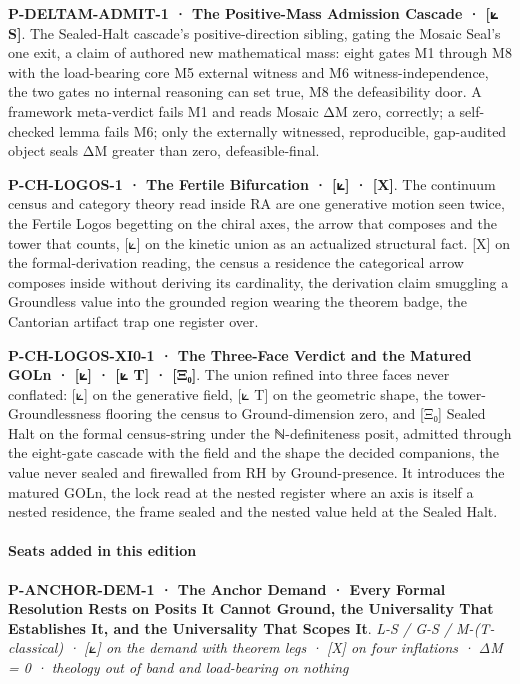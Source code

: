 \documentclass[10pt,twocolumn]{article}
\begin{document}
\textbf{P-DELTAM-ADMIT-1 · The Positive-Mass Admission Cascade · {[}⟀
S{]}}. The Sealed-Halt cascade's positive-direction sibling, gating the
Mosaic Seal's one exit, a claim of authored new mathematical mass: eight
gates M1 through M8 with the load-bearing core M5 external witness and
M6 witness-independence, the two gates no internal reasoning can set
true, M8 the defeasibility door. A framework meta-verdict fails M1 and
reads Mosaic ΔM zero, correctly; a self-checked lemma fails M6; only the
externally witnessed, reproducible, gap-audited object seals ΔM greater
than zero, defeasible-final.

\textbf{P-CH-LOGOS-1 · The Fertile Bifurcation · {[}⟀{]} · {[}X{]}}. The
continuum census and category theory read inside RA are one generative
motion seen twice, the Fertile Logos begetting on the chiral axes, the
arrow that composes and the tower that counts, {[}⟀{]} on the kinetic
union as an actualized structural fact. {[}X{]} on the formal-derivation
reading, the census a residence the categorical arrow composes inside
without deriving its cardinality, the derivation claim smuggling a
Groundless value into the grounded region wearing the theorem badge, the
Cantorian artifact trap one register over.

\textbf{P-CH-LOGOS-XI0-1 · The Three-Face Verdict and the Matured GOLn ·
{[}⟀{]} · {[}⟀ T{]} · {[}Ξ₀{]}}. The union refined into three faces
never conflated: {[}⟀{]} on the generative field, {[}⟀ T{]} on the
geometric shape, the tower-Groundlessness flooring the census to
Ground-dimension zero, and {[}Ξ₀{]} Sealed Halt on the formal
census-string under the ℕ-definiteness posit, admitted through the
eight-gate cascade with the field and the shape the decided companions,
the value never sealed and firewalled from RH by Ground-presence. It
introduces the matured GOLn, the lock read at the nested register where
an axis is itself a nested residence, the frame sealed and the nested
value held at the Sealed Halt.

\hypertarget{seats-added-in-this-edition-1}{%
\paragraph{Seats added in this
edition}\label{seats-added-in-this-edition-1}}

\textbf{P-ANCHOR-DEM-1 · The Anchor Demand · Every Formal Resolution
Rests on Posits It Cannot Ground, the Universality That Establishes It,
and the Universality That Scopes It}. \emph{L-S / G-S / M-(T-classical)
· {[}⟀{]} on the demand with theorem legs · {[}X{]} on four inflations ·
ΔM = 0 · theology out of band and load-bearing on nothing}
\end{document}
